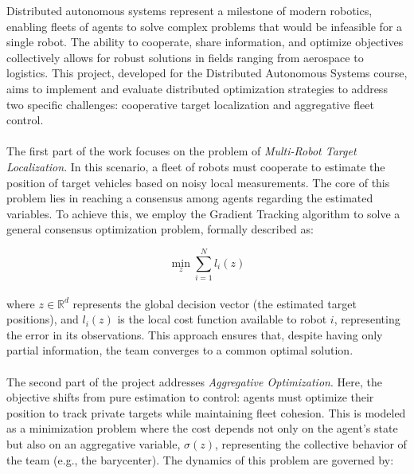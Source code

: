 \documentclass[a4paper,11pt,oneside]{book}
\begin{document}
Distributed autonomous systems represent a milestone of modern robotics, enabling fleets of agents to solve complex problems that would be infeasible for a single robot. The ability to cooperate, share information, and optimize objectives collectively allows for robust solutions in fields ranging from aerospace to logistics. This project, developed for the Distributed Autonomous Systems course, aims to implement and evaluate distributed optimization strategies to address two specific challenges: cooperative target localization and aggregative fleet control.
\\\\
The first part of the work focuses on the problem of \textit{Multi-Robot Target Localization}. In this scenario, a fleet of robots must cooperate to estimate the position of target vehicles based on noisy local measurements. The core of this problem lies in reaching a consensus among agents regarding the estimated variables. To achieve this, we employ the Gradient Tracking algorithm to solve a general consensus optimization problem, formally described as:

\[
    \min_{z} \sum_{i=1}^{N} l_{i}(z)
    \]
\\
where $z \in \mathbb{R}^d$ represents the global decision vector (the estimated target positions), and $l_i(z)$ is the local cost function available to robot $i$, representing the error in its observations. This approach ensures that, despite having only partial information, the team converges to a common optimal solution.
\\\\
The second part of the project addresses \textit{Aggregative Optimization}. Here, the objective shifts from pure estimation to control: agents must optimize their position to track private targets while maintaining fleet cohesion. This is modeled as a minimization problem where the cost depends not only on the agent's state but also on an aggregative variable, $\sigma(z)$, representing the collective behavior of the team (e.g., the barycenter). The dynamics of this problem are governed by:
\end{document}
